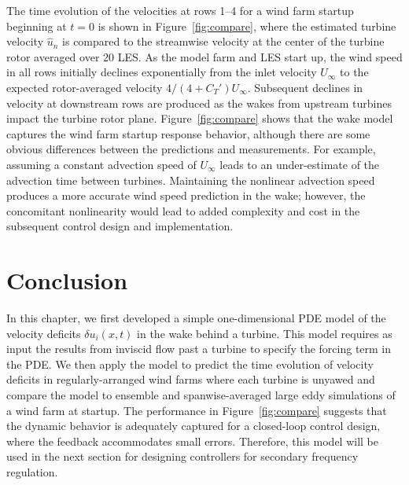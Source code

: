 The time evolution of the velocities at rows 1--4 for a wind farm startup beginning at $t=0$ is shown in Figure~\ref{fig:compare}, where the estimated turbine velocity $\hat{u}_n$ is compared to the streamwise velocity at the center of the turbine rotor averaged over 20 LES. As the model farm and LES start up, the wind speed in all rows initially declines exponentially from the inlet velocity $U_\infty$ to the expected rotor-averaged velocity $4/(4+C_T') U_\infty$. Subsequent declines in velocity at downstream rows are produced as the wakes from upstream turbines impact the turbine rotor plane. Figure~\ref{fig:compare} shows that the wake model captures the wind farm startup response behavior, although there are some obvious differences between the predictions and measurements. For example, assuming a constant advection speed of $U_\infty$ leads to an under-estimate of the advection time between turbines. Maintaining the nonlinear advection speed produces a more accurate wind speed prediction in the wake; however, the concomitant nonlinearity would lead to added complexity and cost in the subsequent control design and implementation. 

\section{Conclusion}
\label{subsec:dynwake-conclusions}
In this chapter, we first developed a simple one-dimensional PDE model of the velocity deficits $\delta u_i(x,t)$ in the wake behind a turbine. This model requires as input the results from inviscid flow past a turbine to specify the forcing term in the PDE. We then apply the model to predict the time evolution of velocity deficits in regularly-arranged wind farms where each turbine is unyawed and compare the model to ensemble and spanwise-averaged large eddy simulations of a wind farm at startup. The performance in Figure~\ref{fig:compare} suggests that the dynamic behavior is adequately captured for a closed-loop control design, where the feedback accommodates small errors. Therefore, this model will be used in the next section for designing controllers for secondary frequency regulation. 
